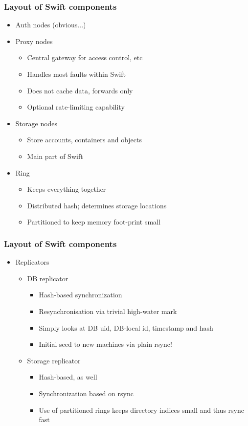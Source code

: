 \documentclass[t]{beamer}
\begin{document}
\begin{frame}
	\frametitle{Layout of Swift components}
	\begin{itemize}
		\item Auth nodes (obvious...)
		\item Proxy nodes
		\begin{itemize}
			\item Central gateway for access control, etc
			\item Handles most faults within Swift
			\item Does not cache data, forwards only
			\item Optional rate-limiting capability
		\end{itemize}
		\item Storage nodes
		\begin{itemize}
			\item Store accounts, containers and objects
			\item Main part of Swift
		\end{itemize}
		\item Ring
		\begin{itemize}
			\item Keeps everything together
			\item Distributed hash; determines storage locations
			\item Partitioned to keep memory foot-print small
		\end{itemize}
	\end{itemize}
\end{frame}

\begin{frame}
	\frametitle{Layout of Swift components}
	\begin{itemize}
		\item Replicators
		\begin{itemize}
			\item DB replicator
			\begin{itemize}
				\item Hash-based synchronization
				\item Resynchronisation via trivial high-water mark
				\item Simply looks at DB uid, DB-local id, timestamp and hash
				\item Initial seed to new machines via plain rsync!
			\end{itemize}
			\item Storage replicator
			\begin{itemize}
				\item Hash-based, as well
				\item Synchronization based on rsync
				\item Use of partitioned rings keeps directory indices small and thus rsync fast
			\end{itemize}
		\end{itemize}
	\end{itemize}
\end{frame}
\end{document}
